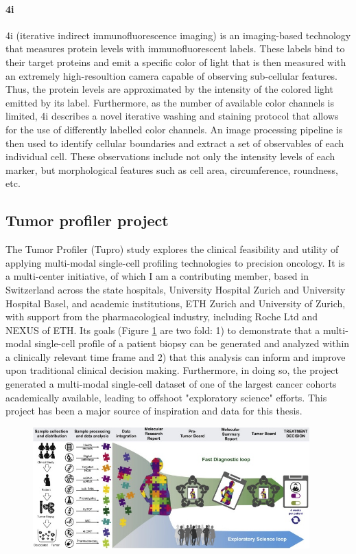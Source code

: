 \paragraph{4i}
4i (iterative indirect immunofluorescence imaging) \cite{gut2018}
is an imaging-based technology that measures protein levels with immunofluorescent labels.
These labels bind to their target proteins and emit a specific color of light
that is then measured with an extremely high-resoultion camera capable of observing sub-cellular features.
Thus, the protein levels are approximated by the intensity of the colored light emitted by its label.
Furthermore, as the number of available color channels is limited,
4i describes a novel iterative washing and staining protocol that allows for the use of differently labelled color channels.
An image processing pipeline is then used to identify cellular boundaries and extract a set of observables of each individual cell.
These observations include not only the intensity levels of each marker, but morphological features such as cell area, circumference, roundness, etc.

\subsection{Tumor profiler project}
The Tumor Profiler (Tupro) study \cite{irmisch2021} explores the clinical feasibility and utility of applying multi-modal single-cell profiling technologies to precision oncology.
It is a multi-center initiative, of which I am a contributing member, based in Switzerland across the state hospitals, University Hospital Zurich and University Hospital Basel, and academic institutions, ETH Zurich and University of Zurich, with support from the pharmacological industry, including Roche Ltd and NEXUS of ETH.
Its goals (Figure \ref{fig:tupro-overview} are two fold:
1) to demonstrate that a multi-modal single-cell profile of a patient biopsy can be generated and analyzed within a clinically relevant time frame
and 2) that this analysis can inform and improve upon traditional clinical decision making.
Furthermore, in doing so, the project generated a multi-modal single-cell dataset of one of the largest cancer cohorts academically available,
leading to offshoot "exploratory science" efforts.
This project has been a major source of inspiration and data for this thesis.

\begin{figure}
  \begin{center}
    \includegraphics[width=0.95\textwidth]{figures/introduction/tupro.jpg}
  \end{center}
  \caption{}\label{fig:tupro-overview}
\end{figure}


